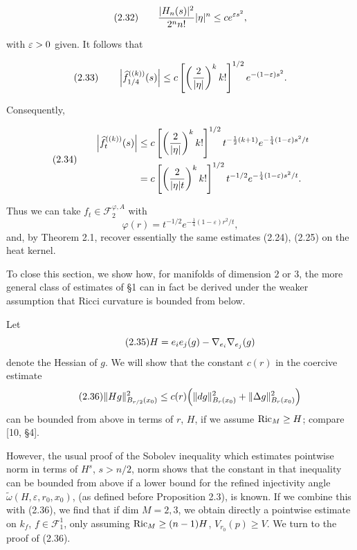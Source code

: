\begin{example}
\begin{equation*}
(2.32)\qquad \frac{|H_n(s)|^2}{2^n n!}|\eta|^n \le c e^{\varepsilon s^2},
\end{equation*}

with $\varepsilon>0$ given. It follows that

\begin{equation*}
(2.33)\qquad \left|\widehat{f}_{1/4}^{((k))}(s)\right|\le c\left[\left(\frac{2}{|\eta|}\right)^k k!\right]^{1/2}e^{-(1-\varepsilon)s^2}.
\end{equation*}

Consequently,

\begin{equation*}
(2.34)\qquad
\begin{aligned}
\left|\widehat{f}_{t}^{((k))}(s)\right|
&\le c\left[\left(\frac{2}{|\eta|}\right)^k k!\right]^{1/2}t^{-\frac12(k+1)}e^{-\frac14(1-\varepsilon)s^2/t}\\
&= c\left[\left(\frac{2}{|\eta|t}\right)^k k!\right]^{1/2}t^{-1/2}e^{-\frac14(1-\varepsilon)s^2/t}.
\end{aligned}
\end{equation*}

Thus we can take $f_t \in \mathscr{F}_2^{\varphi,A}$ with
\[
\varphi(r)=t^{-1/2}e^{-\frac14(1-\varepsilon)r^2/t},
\]
and, by Theorem 2.1, recover essentially the same estimates (2.24), (2.25) on the heat kernel.
\end{example}

To close this section, we show how, for manifolds of dimension $2$ or $3$, the more general class of estimates of \S1 can in fact be derived under the weaker assumption that Ricci curvature is bounded from below.

Let
\begin{equation}\tag{2.35}
H=e_i e_j(g)-\nabla_{e_i}\nabla_{e_j}(g)
\end{equation}
denote the Hessian of $g$. We will show that the constant $c(r)$ in the coercive estimate
\begin{equation}\tag{2.36}
\|Hg\|_{B_{r/2}(x_0)}^{2}\le c(r)\Bigl(\|dg\|_{B_r(x_0)}^{2}+\|\Delta g\|_{B_r(x_0)}^{2}\Bigr)
\end{equation}
can be bounded from above in terms of $r$, $H$, if we assume $\operatorname{Ric}_M\ge H$; compare [10, \S4].

However, the usual proof of the Sobolev inequality which estimates pointwise norm in terms of $H^s$, $s>n/2$, norm shows that the constant in that inequality can be bounded from above if a lower bound for the refined injectivity angle $\widetilde{\omega}(H,\varepsilon,r_0,x_0)$, (as defined before Proposition 2.3), is known.
If we combine this with (2.36), we find that if dim $M=2,3$, we obtain directly a pointwise estimate on $k_f$, $f\in \mathscr{F}_1^{1}$, only assuming $\operatorname{Ric}_M\ge (n-1)H$, $V_{r_0}(p)\ge V$. We turn to the proof of (2.36).

